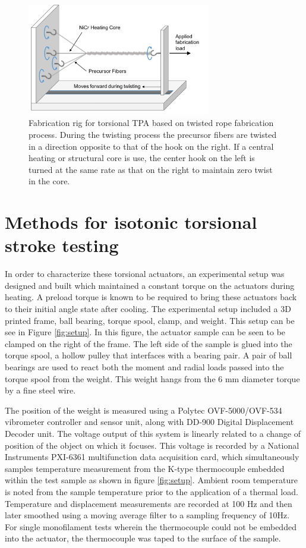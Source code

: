 \documentclass[twocolumn,10pt]{asme2e}
\begin{document}
\begin{figure}
    \centering
        \includegraphics[width=8cm]{../Images/coiling_rig.pdf}
        \caption{Fabrication rig for torsional TPA based on twisted rope fabrication process. During the twisting process the precursor fibers are twisted in a direction opposite to that of the hook on the right. If a central heating or structural core is use, the center hook on the left is turned at the same rate as that on the right to maintain zero twist in the core. }
        \label{fig:coiled}
\end{figure}

\section{Methods for isotonic torsional stroke testing}
In order to characterize these torsional actuators, an experimental setup was designed and built which maintained a constant torque on the actuators during heating. A preload torque is known to be required to bring these actuators back to their initial angle state after cooling. The experimental setup included a 3D printed frame, ball bearing, torque spool, clamp, and weight. This setup can be see in Figure \ref{fig:setup}. In this figure, the actuator sample can be seen to be clamped on the right of the frame. The left side of the sample is glued into the torque spool, a hollow pulley that interfaces with a bearing pair. A pair of ball bearings are used to react both the moment and radial loads passed into the torque spool from the weight. This weight hangs from the 6 mm diameter torque by a fine steel wire. 

The position of the weight is measured using a Polytec OVF-5000/OVF-534 vibrometer controller and sensor unit, along with DD-900 Digital Displacement Decoder unit. The voltage output of this system is linearly related to a change of position of the object on which it focuses. This voltage is recorded by a National Instruments PXI-6361 multifunction data acquisition card, which simultaneously samples temperature measurement from the K-type thermocouple embedded within the test sample as shown in figure \ref{fig:setup}. Ambient room temperature is noted from the sample temperature prior to the application of a thermal load. Temperature and displacement measurements are recorded at 100 Hz and then later smoothed using a moving average filter to a sampling frequency of 10Hz. For single monofilament tests wherein the thermocouple could not be embedded into the actuator, the thermocouple was taped to the surface of the sample. 
\end{document}
